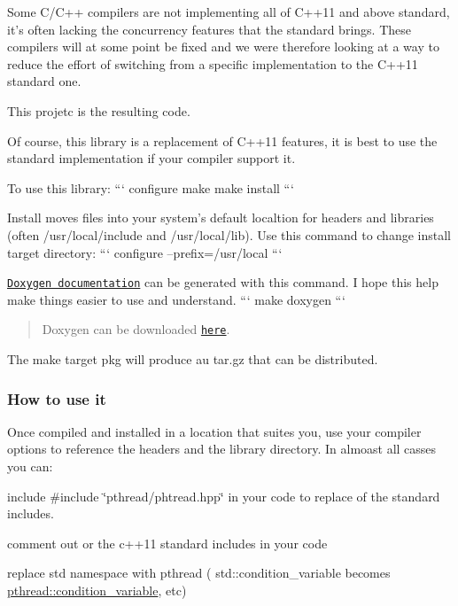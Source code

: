 Some C/\+C++ compilers are not implementing all of C++11 and above standard, it's often lacking the concurrency features that the standard brings. These compilers will at some point be fixed and we were therefore looking at a way to reduce the effort of switching from a specific implementation to the C++11 standard one.

This projetc is the resulting code.

Of course, this library is a replacement of C++11 features, it is best to use the standard implementation if your compiler support it.

To use this library\+: ``` configure make make install ```

Install moves files into your system's default localtion for headers and libraries (often /usr/local/include and /usr/local/lib). Use this command to change install target directory\+: ``` configure --prefix=/usr/local ```

\href{http://herbertkoelman.github.io/cpp-pthread/doc/html/}{\tt Doxygen documentation} can be generated with this command. I hope this help make things easier to use and understand. ``` make doxygen ```

\begin{quote}
Doxygen can be downloaded \href{http://www.stack.nl/~dimitri/doxygen/index.html}{\tt here}. \end{quote}


The {\ttfamily make} target {\ttfamily pkg} will produce au tar.\+gz that can be distributed.

\subsubsection*{How to use it}

Once compiled and installed in a location that suites you, use your compiler options to reference the headers and the library directory. In almoast all casses you can\+:
\begin{DoxyItemize}
\item include {\ttfamily \#include \char`\"{}pthread/phtread.\+hpp\char`\"{}} in your code to replace of the standard includes.
\item comment out or the c++11 standard includes in your code
\item replace {\ttfamily std} namespace with {\ttfamily pthread} ( std\+::condition\+\_\+variable becomes \hyperlink{classpthread_1_1condition__variable}{pthread\+::condition\+\_\+variable}, etc)
\end{DoxyItemize}

